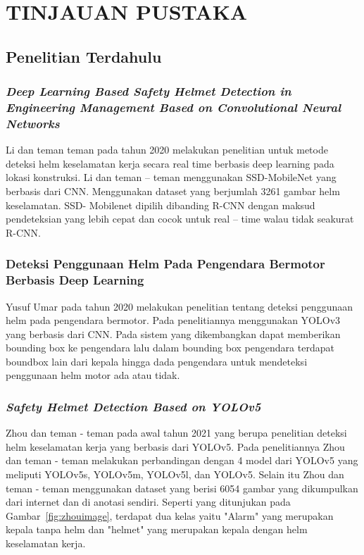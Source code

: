 \chapter{TINJAUAN PUSTAKA}
\label{chap:tinjauanpustaka}


\section{Penelitian Terdahulu}
\label{sec:penelitianterdahulu}

\subsection{\emph{Deep Learning Based Safety Helmet Detection in Engineering Management Based on Convolutional Neural Networks}}
\label{subsec:deeplearningli2020}

Li dan teman teman pada tahun 2020 melakukan penelitian untuk metode deteksi helm keselamatan kerja secara real time berbasis deep learning pada lokasi konstruksi. Li dan teman – teman menggunakan SSD-MobileNet yang berbasis dari CNN. Menggunakan dataset yang berjumlah 3261 gambar helm keselamatan. SSD- Mobilenet dipilih dibanding R-CNN dengan maksud pendeteksian yang lebih cepat dan cocok untuk real – time walau tidak seakurat R-CNN. \cite{li2020deep}

\subsection{Deteksi Penggunaan Helm Pada Pengendara Bermotor Berbasis Deep Learning}
\label{subsec:deteksihelmmotoryusuf}
\par Yusuf Umar pada tahun 2020 melakukan penelitian tentang
 deteksi penggunaan helm pada pengendara bermotor. 
 Pada penelitiannya menggunakan YOLOv3 yang berbasis dari CNN. 
 Pada sistem yang dikembangkan dapat memberikan bounding box ke 
 pengendara lalu dalam bounding box pengendara terdapat boundbox 
 lain dari kepala hingga dada pengendara untuk mendeteksi 
 penggunaan helm motor ada atau tidak. \cite{hanafi2020deteksi}

\subsection{\emph{Safety Helmet Detection Based on YOLOv5}}
\label{subsec:safetyhelmetyolov5}
\par Zhou dan teman - teman pada awal tahun 2021 yang berupa penelitian deteksi helm keselamatan kerja yang 
berbasis dari YOLOv5. Pada penelitiannya Zhou dan teman - teman melakukan perbandingan dengan 4 model dari 
YOLOv5 yang meliputi YOLOv5s, YOLOv5m, YOLOv5l, dan YOLOv5. Selain itu Zhou dan teman - teman menggunakan 
dataset yang berisi 6054 gambar yang dikumpulkan dari internet dan di anotasi sendiri. 
Seperti yang ditunjukan pada Gambar~\ref{fig:zhouimage}, terdapat dua kelas yaitu "Alarm" yang merupakan kepala tanpa helm dan
"helmet"  yang merupakan kepala dengan helm keselamatan kerja\cite{zhou_zhao_nie_2021}.

